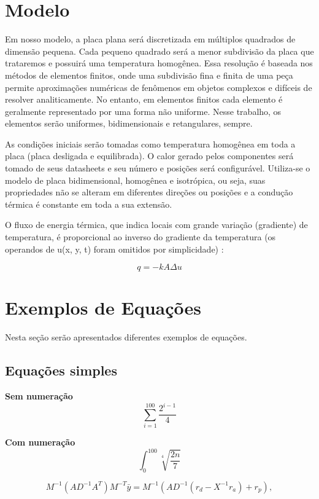 \documentclass[12pt,fleqn]{article}
\begin{document}
\section{Modelo}
Em nosso modelo, a placa plana será discretizada em múltiplos quadrados de dimensão pequena. Cada pequeno quadrado será a menor subdivisão da placa que trataremos e possuirá uma temperatura homogênea. Essa resolução é baseada nos métodos de elementos finitos, onde uma subdivisão fina e finita de uma peça permite aproximações numéricas de fenômenos em objetos complexos e difíceis de resolver analiticamente. No entanto, em elementos finitos cada elemento é geralmente representado por uma forma não uniforme. Nesse trabalho, os elementos serão uniformes, bidimensionais e retangulares, sempre.

As condições iniciais serão tomadas como temperatura homogênea em toda a placa (placa desligada e equilibrada). O calor gerado pelos componentes será tomado de seus datasheets e seu número e posições será configurável. Utiliza-se o modelo de placa bidimensional, homogênea e isotrópica, ou seja, suas propriedades não se alteram em diferentes direções ou posições e a condução térmica é constante em toda a sua extensão.

O fluxo de energia térmica, que indica locais com grande variação (gradiente) de temperatura, é proporcional ao inverso do gradiente da temperatura (os operandos de u(x, y, t) foram omitidos por simplicidade) \cite{ufsc_geracao_de_calor}:

\[q = -k A \Delta u\]


\section{Exemplos de Equações}
Nesta seção serão apresentados diferentes exemplos de equações.

\subsection{Equações simples}

\textbf{Sem numeração}
\[\sum_{i=1}^{100}\frac{2^{i-1}}{4}\]

\textbf{Com numeração}
\begin{equation}
	\int_{0}^{100}\sqrt[4]{\frac{2n}{7}}
\end{equation}

\begin{equation}
M^{-1}(AD^{-1}A^T)M^{-T}\bar{y} = M^{-1}(AD^{-1}(r_d -X^{-1}r_a) + r_p),
\end{equation}
\end{document}

